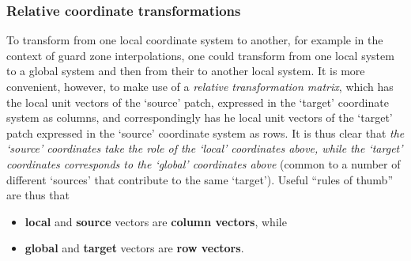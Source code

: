\documentclass[paper=a4,fontsize=11pt]{scrartcl}
\numberwithin{equation}{section}		%
\numberwithin{figure}{section}			%
\numberwithin{table}{section}				%
\begin{document}
\subsubsection{Relative coordinate transformations}
To transform from one local coordinate system to another, for example in the context of guard zone interpolations, one could transform from one local system to a global system and then from their to another local system.  It is more convenient, however, to make use of a \textit{relative transformation matrix}, which has the local unit vectors of the `source' patch, expressed in the `target' coordinate system as columns, and correspondingly has he local unit vectors of the `target' patch expressed in the `source' coordinate system as rows.  It is thus clear that \textit{the `source' coordinates take the role of the `local' coordinates above, while the `target' coordinates corresponds to the `global' coordinates above} (common to a number of different `sources' that contribute to the same `target'). Useful ``rules of thumb'' are thus that
\begin{itemize}
    \item \textbf{local} and \textbf{source} vectors are \textbf{column vectors}, while
    \item \textbf{global} and \textbf{target} vectors are \textbf{row vectors}.
\end{itemize}
\end{document}
